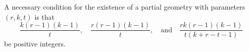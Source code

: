 A necessary condition for the existence of a partial geometry with parameters $(r, k, t)$ is that
$$\frac{k(r - 1)(k - 1)}{t}, \quad \frac{r(r - 1)(k - 1)}{t}, \quad \text{and} \quad \frac{rk(r - 1)(k - 1)}{t(k + r - t - 1)}$$
be positive integers.
